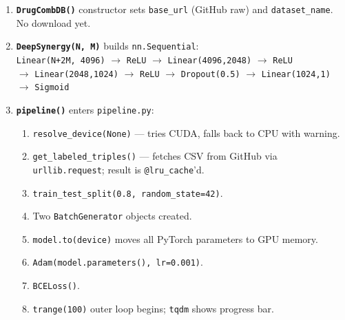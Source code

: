 \documentclass[12pt,a4paper,oneside]{book}
\begin{document}
\begin{enumerate}
  \item \textbf{\texttt{DrugCombDB()}} constructor sets \texttt{base\_url} (GitHub raw) and \texttt{dataset\_name}. No download yet.

  \item \textbf{\texttt{DeepSynergy(N, M)}} builds \texttt{nn.Sequential}:\\
  \texttt{Linear(N+2M, 4096)} $\to$ \texttt{ReLU} $\to$ \texttt{Linear(4096,2048)} $\to$ \texttt{ReLU}\\
  $\to$ \texttt{Linear(2048,1024)} $\to$ \texttt{ReLU} $\to$ \texttt{Dropout(0.5)} $\to$ \texttt{Linear(1024,1)} $\to$ \texttt{Sigmoid}

  \item \textbf{\texttt{pipeline()}} enters \texttt{pipeline.py}:
  \begin{enumerate}
    \item \texttt{resolve\_device(None)} --- tries CUDA, falls back to CPU with warning.
    \item \texttt{get\_labeled\_triples()} --- fetches CSV from GitHub via \texttt{urllib.request}; result is \texttt{@lru\_cache}'d.
    \item \texttt{train\_test\_split(0.8, random\_state=42)}.
    \item Two \texttt{BatchGenerator} objects created.
    \item \texttt{model.to(device)} moves all PyTorch parameters to GPU memory.
    \item \texttt{Adam(model.parameters(), lr=0.001)}.
    \item \texttt{BCELoss()}.
    \item \texttt{trange(100)} outer loop begins; \texttt{tqdm} shows progress bar.
  \end{enumerate}


\end{enumerate}
\end{document}
